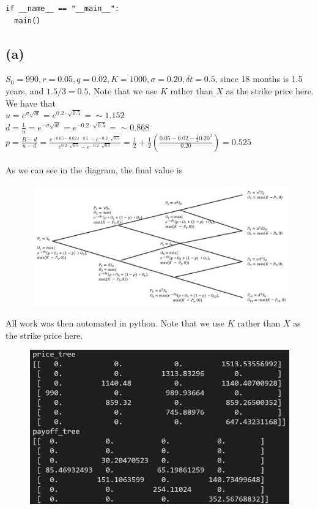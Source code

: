 \documentclass{article}
\begin{document}
{\begin{verbatim}
if __name__ == "__main__":
  main()

\end{verbatim}

\subsection*{(a)}

$S_0 = 990, r = 0.05, q = 0.02, K = 1000, \sigma = 0.20, \delta t = 0.5$, since 18 months is 1.5 years, and $1.5 / 3 = 0.5$. Note that we use $K$ rather than $X$ as the strike price here. \\
We have that \\
$u = e^{\sigma\sqrt{\delta t}} = e^{0.2 \cdot \sqrt{0.5}} = \sim 1.152$ \\
$d = \frac{1}{u} = e^{-\sigma\sqrt{\delta t}} = e^{-0.2 \cdot \sqrt{0.5}} = \sim 0.868$ \\
$p = \frac{R - d}{u - d} = \frac{e^{(0.05 - 0.02) \cdot 0.5} - e^{-0.2 \cdot \sqrt{0.5}}}{e^{0.2 \cdot \sqrt{0.5}} - e^{-0.2 \cdot \sqrt{0.5}}} = \frac{1}{2} + \frac{1}{2}(\frac{0.05 - 0.02 - \frac{1}{2}0.20^2}{0.20}) = 0.525$ \\ \\
As we can see in the diagram, the final value is 

\begin{figure}[h]
  \centering
  \includegraphics[width=120mm]{./2a_tree.png}
\end{figure}

All work was then automated in python. Note that we use $K$ rather than $X$ as the strike price here. 

\begin{figure}[h]
  \centering
  \includegraphics[width=120mm]{./2a.png}
\end{figure}

}
\end{document}
